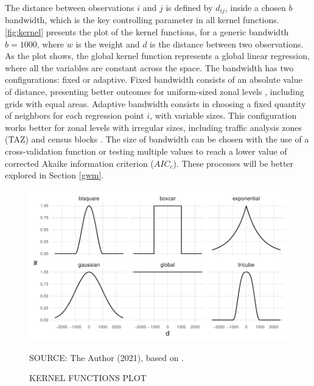The distance between observations $i$ and $j$ is defined by $d_{ij}$, inside a chosen $b$ bandwidth, which is the key controlling parameter in all kernel functions. \autoref{fig:kernel} presents the plot of the kernel functions, for a generic bandwidth $b = 1000$, where $w$ is the weight and $d$ is the distance between two observations. As the plot shows, the global kernel function represents a global linear regression, where all the variables are constant across the space. The bandwidth has two configurations: fixed or adaptive. Fixed bandwidth consists of an absolute value of distance, presenting better outcomes for uniform-sized zonal levels \cite{Huang2018}, including grids with equal areas. Adaptive bandwidth consists in choosing a fixed quantity of neighbors for each regression point $i$, with variable sizes. This configuration works better for zonal levels with irregular sizes, including traffic analysis zones (TAZ) and census blocks \cite{Yu2017}. The size of bandwidth can be chosen with the use of a cross-validation function or testing multiple values to reach a lower value of corrected Akaike information criterion ($AIC_c$). These processes will be better explored in Section \ref{gwm}.

\begin{figure}[!htbp]
    \centering\footnotesize
    \captionsetup{font=footnotesize}
    \caption{KERNEL FUNCTIONS PLOT}
    \includegraphics{fig/kernel.pdf}
    \label{fig:kernel}
    \par SOURCE: The Author (2021), based on \textcite{Gollini2013}.
\end{figure}

